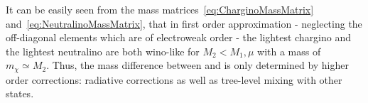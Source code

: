 It can be easily seen from the mass matrices~\eqref{eq:CharginoMassMatrix} and~\eqref{eq:NeutralinoMassMatrix}, that in first order approximation - neglecting the off-diagonal elements which are of electroweak order - the lightest chargino and the lightest neutralino are both wino-like for $M_2 < M_1,\mu$ with a mass of $m_\chi \simeq M_2$. 
Thus, the mass difference between \chipm and \chiO is only determined by higher order corrections: radiative corrections as well as tree-level mixing with other states.\\



